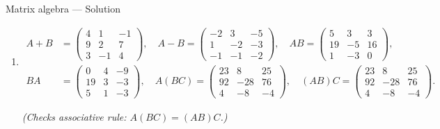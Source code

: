 \documentclass[9pt]{beamer}
\begin{document}
\begin{frame}{Matrix algebra — Solution}
\begin{enumerate}[leftmargin = 0.35cm, label = \arabic*., rightmargin = 0.2cm]
\item 
$
\begin{aligned}
A+B&=\begin{pmatrix}4&1&-1\\9&2&7\\3&-1&4\end{pmatrix},\quad
A-B=\begin{pmatrix}-2&3&-5\\1&-2&-3\\-1&-1&-2\end{pmatrix},\quad
AB=\begin{pmatrix}5&3&3\\19&-5&16\\1&-3&0\end{pmatrix}, \\
BA&=\begin{pmatrix}0&4&-9\\19&3&-3\\5&1&-3\end{pmatrix},\quad
A(BC)=\begin{pmatrix}23&8&25\\92&-28&76\\4&-8&-4\end{pmatrix},\quad
(AB)C=\begin{pmatrix}23&8&25\\92&-28&76\\4&-8&-4\end{pmatrix}.
\end{aligned}
$
\vspace{0.3cm}

\textit{(Checks associative rule: $A(BC)=(AB)C$.)}

\end{enumerate}
\end{frame}
\end{document}

